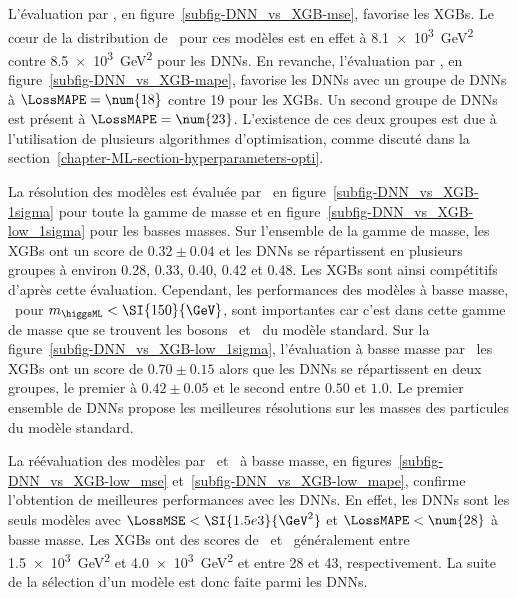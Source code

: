 L'évaluation par \LossMSE, en figure~\ref{subfig-DNN_vs_XGB-mse}, favorise les XGBs.
Le cœur de la distribution de \LossMSE\ pour ces modèles est en effet à \SI{8.1e3}{\GeV^2}
contre \SI{8.5e3}{\GeV^2} pour les DNNs.
En revanche,
l'évaluation par \LossMAPE, en figure~\ref{subfig-DNN_vs_XGB-mape}, favorise les DNNs
avec un groupe de DNNs à $\LossMAPE=\num{18}$
contre \num{19} pour les XGBs.
Un second groupe de DNNs est présent à $\LossMAPE=\num{23}$.
L'existence de ces deux groupes est due à l'utilisation de plusieurs algorithmes d'optimisation, comme discuté dans la section~\ref{chapter-ML-section-hyperparameters-opti}.
\par
La résolution des modèles est évaluée par \OneSigmaWidth\
en figure~\ref{subfig-DNN_vs_XGB-1sigma} pour toute la gamme de masse
et
en figure~\ref{subfig-DNN_vs_XGB-low_1sigma} pour les basses masses.
Sur l'ensemble de la gamme de masse,
les XGBs ont un score de $\num{0.32}\pm\num{0.04}$
et
les DNNs se répartissent en plusieurs groupes
à environ
\num{0.28}, \num{0.33}, \num{0.40}, \num{0.42} et \num{0.48}.
Les XGBs sont ainsi compétitifs d'après cette évaluation.
Cependant,
les performances des modèles
à basse masse, \ie\ pour $m_{\higgsML} < \SI{150}{\GeV}$,
sont importantes car c'est dans cette gamme de masse que se trouvent les bosons \Zboson\ et \higgs\ du modèle standard.
Sur la figure~\ref{subfig-DNN_vs_XGB-low_1sigma},
l'évaluation à basse masse par \OneSigmaWidth\
les XGBs ont un score de $\num{0.70}\pm\num{0.15}$
alors que les DNNs se répartissent en deux groupes,
le premier à $\num{0.42}\pm\num{0.05}$
et
le second entre $\num{0.50}$ et $\num{1.0}$.
Le premier ensemble de DNNs propose les meilleures résolutions sur les masses des particules du modèle standard.
\par
La réévaluation des modèles par 
\LossMSE\ et \LossMAPE\ à basse masse, en figures~\ref{subfig-DNN_vs_XGB-low_mse} et~\ref{subfig-DNN_vs_XGB-low_mape},
confirme l'obtention de meilleures performances avec les DNNs.
En effet,
les DNNs sont les seuls modèles avec
$\LossMSE < \SI{1.5e3}{\GeV^2}$
et
$\LossMAPE < \num{28}$
à basse masse.
Les XGBs ont des scores de \LossMSE\ et \LossMAPE\ généralement
entre \SI{1.5e3}{\GeV^2} et \SI{4.0e3}{\GeV^2}
et
entre \num{28} et \num{43},
respectivement.
La suite de la sélection d'un modèle est donc faite parmi les DNNs.
